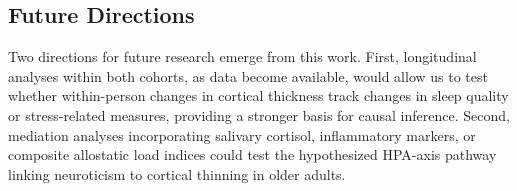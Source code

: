 \subsection{Future Directions}

Two directions for future research emerge from this work.
First, longitudinal analyses within both cohorts, as data become available, would allow us to test whether within-person changes in cortical thickness track changes in sleep quality or stress-related measures, providing a stronger basis for causal inference.
Second, mediation analyses incorporating salivary cortisol, inflammatory markers, or composite allostatic load indices could test the hypothesized HPA-axis pathway linking neuroticism to cortical thinning in older adults.

